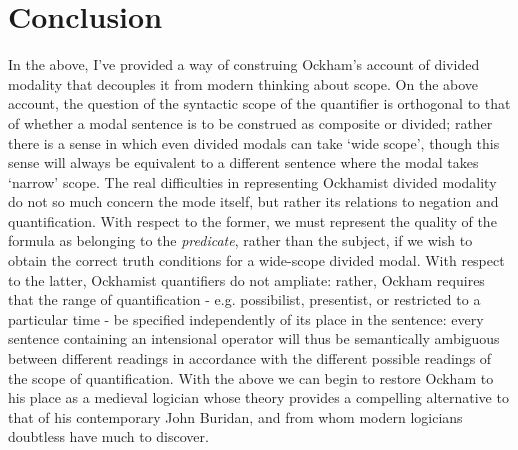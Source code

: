 \documentclass[]{article}
\begin{document}
	\section{Conclusion}
	In the above, I've provided a way of construing Ockham's account of divided modality that decouples it from modern thinking about scope. On the above account, the question of the syntactic scope of the quantifier is orthogonal to that of whether a modal sentence is to be construed as composite or divided; rather there is a sense in which even divided modals can take `wide scope', though this sense will always be equivalent to a different sentence where the modal takes `narrow' scope. The real difficulties in representing Ockhamist divided modality do not so much concern the mode itself, but rather its relations to negation and quantification. With respect to the former, we must represent the quality of the formula as belonging to the \textit{predicate}, rather than the subject, if we wish to obtain the correct truth conditions for a wide-scope divided modal. With respect to the latter, Ockhamist quantifiers do not ampliate: rather, Ockham requires that the range of quantification - e.g. possibilist, presentist, or restricted to a particular time - be specified independently of its place in the sentence: every sentence containing an intensional operator will thus be semantically ambiguous between different readings in accordance with the different possible readings of the scope of quantification. With the above we can begin to restore Ockham to his place as a medieval logician whose theory provides a compelling alternative to that of his contemporary John Buridan, and from whom modern logicians doubtless have much to discover.
	\printbibliography
\end{document}
